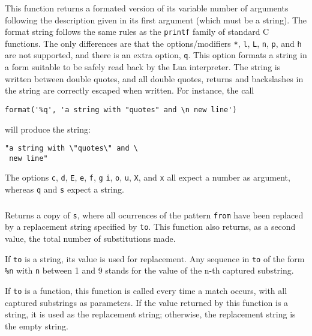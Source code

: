 \subsubsection*{}
\label{format}
This function returns a formated version of its variable number of arguments
following the description given in its first argument (which must be a string). 
The format string follows the same rules as the \verb'printf' family of
standard C functions.
The only differences are that the options/modifiers
\verb'*', \verb'l', \verb'L', \verb'n', \verb'p',
and \verb'h' are not supported,
and there is an extra option, \verb'q'.
This option formats a string in a form suitable to be safely read
back by the Lua interpreter.
The string is written between double quotes,
and all double quotes, returns and backslashes in the string
are correctly escaped when written.
For instance, the call
\begin{verbatim}
format('%q', 'a string with "quotes" and \n new line')
\end{verbatim}
will produce the string:
\begin{verbatim}
"a string with \"quotes\" and \
 new line"
\end{verbatim}

The options \verb'c', \verb'd', \verb'E', \verb'e', \verb'f',
\verb'g' \verb'i', \verb'o', \verb'u', \verb'X', and \verb'x' all
expect a number as argument,
whereas \verb'q' and \verb's' expect a string.

\subsubsection*{}
Returns a copy of \verb-s-,
where all ocurrences of the pattern \verb-from- have been
replaced by a replacement string specified by \verb-to-.
This function also returns, as a second value,
the total number of substitutions made.

If \verb-to- is a string, its value is used for replacement.
Any sequence in \verb-to- of the form \verb-%n- with \verb-n- between 1 and 9
stands for the value of the n-th captured substring.

If \verb-to- is a function, this function is called every time a
match occurs, with all captured substrings as parameters.
If the value returned by this function is a string,
it is used as the replacement string;
otherwise, the replacement string is the empty string.

